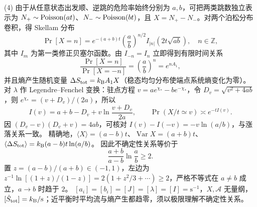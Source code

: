 (4) 由于从任意状态出发顺、逆跳的危险率始终分别为 \(a,b\)，可把两类跳数独立表示为
\(N_+\sim{\rm Poisson}(at)\)、\(N_-\sim{\rm Poisson}(bt)\)，且 \(X=N_+-N_-\)。对两个泊松分布卷积，得 Skellam 分布
\[
 \boxed{\Pr[X=n]=e^{-(a+b)t}
 \left(\frac ab\right)^{n/2}
 I_{|n|}(2t\sqrt{ab})},\quad n\in\mathbb Z,
\]
其中 \(I_m\) 为第一类修正贝塞尔函数。由 \(I_{-n}=I_n\) 立即得到有限时间关系
\[
 \boxed{\frac{\Pr[X=n]}{\Pr[X=-n]}=\left(\frac ab\right)^n=e^{nA_1}},
\]
并且熵产生随机变量 \(\Delta S_{\rm tot}=k_{\rm B}A_1X\)（稳态均匀分布使端点系统熵变化为零）。
对 \(\lambda\) 作 Legendre--Fenchel 变换：驻点方程
\(v=a e^{\chi_*}-b e^{-\chi_*}\)，令
\(D_v=\sqrt{v^2+4ab}\)，则
\(e^{\chi_*}=(v+D_v)/(2a)\)，所以
\[
 \boxed{I(v)=a+b-D_v+v\ln\frac{v+D_v}{2a}},
 \qquad \Pr(X/t\simeq v)\asymp e^{-tI(v)}.
\]
因 \((D_v-v)(D_v+v)=4ab\)，可核对
\(I(v)-I(-v)=-v\ln(a/b)\)，与涨落关系一致。
精确地，\(\langle X\rangle=(a-b)t\)、\(\operatorname{Var}X=(a+b)t\)、
\(\langle\Delta S_{\rm tot}\rangle=k_{\rm B}(a-b)t\ln(a/b)\)。
因此不确定性关系等价于
\[
 \frac{a+b}{a-b}\ln\frac ab\ge2.
\]
置 \(z=(a-b)/(a+b)\in(-1,1)\)，左边为
\(z^{-1}\ln[(1+z)/(1-z)]=2(1+z^2/3+\cdots)\ge2\)，严格不等式在 \(a\ne b\) 成立，\(a\to b\) 时趋于 \(2\)。
\([a_i]=[b_i]=[J]=[\lambda]=[I]=\mathrm{s}^{-1}\)，\(X,\mathcal A\) 无量纲，\([\dot S_{\rm tot}]=k_{\rm B}/\mathrm{s}\)；近平衡时平均流与熵产生都趋零，须以极限理解不确定性关系。
